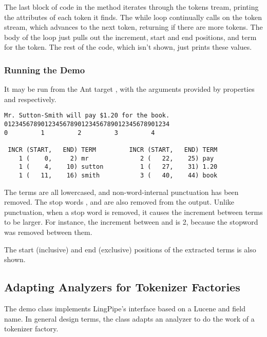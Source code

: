The last block of code in the  method iterates through
the tokens tream, printing the attributes of each token it finds.
%
%
The while loop continually calls  on the token
stream, which advances to the next token, returning  if
there are more tokens.  The body of the loop just pulls out the
increment, start and end positions, and term for the token.  The
rest of the code, which isn't shown, just prints these values.

\subsubsection{Running the Demo}

It may be run from the Ant target , with
the arguments provided by properties  and 
 respectively.

\begin{verbatim}
Mr. Sutton-Smith will pay $1.20 for the book.
012345678901234567890123456789012345678901234
0         1         2         3         4

 INCR (START,   END) TERM         INCR (START,   END) TERM
    1 (    0,     2) mr              2 (   22,    25) pay
    1 (    4,    10) sutton          1 (   27,    31) 1.20
    1 (   11,    16) smith           3 (   40,    44) book
\end{verbatim}
%
The terms are all lowercased, and non-word-internal punctuation has
been removed.  The stop words , 
and  are also removed from the output.  Unlike
punctuation, when a stop word is removed, it causes the increment
between terms to be larger.  For instance, the increment between
 and  is 2, because the stopword
 was removed between them.  

The start (inclusive) and end (exclusive) positions of the
extracted terms is also shown.


\subsection{Adapting Analyzers for Tokenizer Factories}

The demo class  implements LingPipe's
 interface based on a Lucene 
and field name.  In general design terms, the class adapts an analyzer
to do the work of a tokenizer factory.


